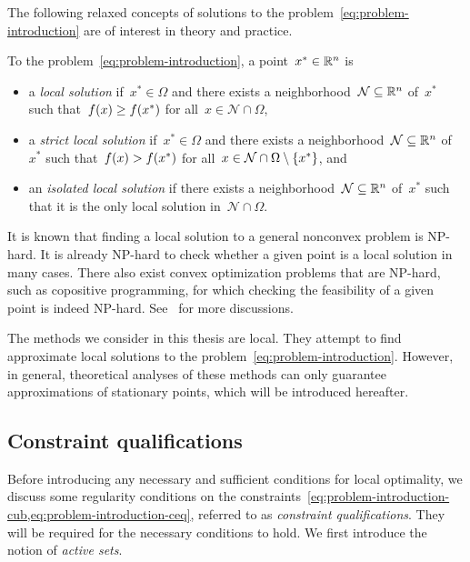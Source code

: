 The following relaxed concepts of solutions to the problem~\cref{eq:problem-introduction} are of interest in theory and practice.

\begin{definition}
    To the problem~\cref{eq:problem-introduction}, a point~$x^{\ast} \in \mathbb{R}^n$ is
    \begin{itemize}
        \item a \emph{local solution} if~$x^{\ast} \in \Omega$ and there exists a neighborhood~$\mathcal{N} \subseteq \mathbb{R}^n$ of~$x^{\ast}$ such that~$f(x) \ge f(x^{\ast})$ for all~$x \in \mathcal{N} \cap \Omega$,
        \item a \emph{strict local solution} if~$x^{\ast} \in \Omega$ and there exists a neighborhood~$\mathcal{N} \subseteq \mathbb{R}^n$ of~$x^{\ast}$ such that~$f(x) > f(x^{\ast})$ for all~$x \in \mathcal{N} \cap \Omega \setminus \{x^{\ast}\}$, and
        \item an \emph{isolated local solution} if there exists a neighborhood~$\mathcal{N} \subseteq \mathbb{R}^n$ of~$x^{\ast}$ such that it is the only local solution in~$\mathcal{N} \cap \Omega$.
    \end{itemize}
\end{definition}

It is known that finding a local solution to a general nonconvex problem is NP-hard.
It is already NP-hard to check whether a given point is a local solution in many cases.
There also exist convex optimization problems that are NP-hard, such as copositive programming, for which checking the feasibility of a given point is indeed NP-hard.
See~\cite{Murty_Kabadi_1987} for more discussions.

The methods we consider in this thesis are local.
They attempt to find approximate local solutions to the problem~\cref{eq:problem-introduction}.
However, in general, theoretical analyses of these methods can only guarantee approximations of stationary points, which will be introduced hereafter.

\subsection{Constraint qualifications}

Before introducing any necessary and sufficient conditions for local optimality, we discuss some regularity conditions on the constraints~\cref{eq:problem-introduction-cub,eq:problem-introduction-ceq}, referred to as \emph{constraint qualifications}.
They will be required for the necessary conditions to hold.
We first introduce the notion of \emph{active sets}.

